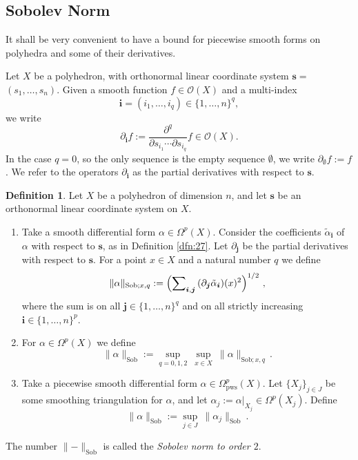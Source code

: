\documentclass[10pt, a4paper]{amsart}
\theoremstyle{definition}
\newtheorem{dfn}[equation]{Definition}
\numberwithin{equation}{section}
\newcommand{\mcal}[1]{\mathcal{#1}}
\newcommand{\mrm}[1]{\mathrm{#1}}
\newcommand{\smfrac}[2]{{\textstyle \frac{#1}{#2}}}
\newcommand{\bsym}[1]{\boldsymbol{#1}}
\newcommand{\bosum}{\sum\nolimits}
\newcommand{\til}[1]{\tilde{#1}}
\newcommand{\norm}[1]{\lVert #1 \rVert}
\newcommand{\lb}{\linebreak}
\begin{document}
\subsection{Sobolev Norm} \label{subsec:sob}
It shall be very convenient to have a bound for piecewise smooth forms
on polyhedra and some of their derivatives. 

Let $X$ be a polyhedron, with orthonormal linear coordinate
system $\bsym{s} =$ \lb  $(s_1, \ldots, s_n)$. Given a smooth function 
$f \in \mcal{O}(X)$ and a multi-index
\[ \bsym{i}  = (i_1, \ldots, i_q) \in \{ 1, \ldots, n \}^q , \]
we write
\[ \partial_{\bsym{i}} f :=
\smfrac{\partial^q}{\partial s_{i_1} \cdots \partial s_{i_q}} f \in  
\mcal{O}(X) . \]
In the case $q = 0$, so the only sequence is the empty sequence 
$\emptyset$, we write
$\partial_{\emptyset} f := f$. 
We refer to the operators $\partial_{\bsym{i}}$ as the partial derivatives
with respect to $\bsym{s}$.

\begin{dfn}
Let $X$ be a polyhedron of dimension $n$, and let $\bsym{s}$ be an
orthonormal linear coordinate system on $X$. 
\begin{enumerate}
\item Take a smooth differential form $\alpha \in \Omega^p(X)$. 
Consider the coefficients $\til{\alpha}_{\bsym{i}}$ of $\alpha$ with
respect to $\bsym{s}$, as in Definition \ref{dfn:27}. 
Let $\partial_{\bsym{j}}$ be the partial derivatives with respect to
$\bsym{s}$. For a point $x \in X$ and a natural number $q$ we define 
\[ \norm{\alpha}_{\mrm{Sob}; x, q} :=
\Bigl( \bosum_{\bsym{i}, \bsym{j}} \, 
(\partial_{\bsym{j}} \til{\alpha}_{\bsym{i}})(x)^2 \Bigr)^{1/2} \ , \]
where the sum is on all 
$\bsym{j} \in \{ 1, \ldots, n \}^q$ and on all strictly increasing 
$\bsym{i} \in \{ 1, \ldots, n \}^p$.

\item For $\alpha \in \Omega^p(X)$ we define 
\[ \norm{\alpha}_{\mrm{Sob}} :=
\sup_{q = 0, 1, 2} \ \sup_{x \in X} \ \norm{\alpha}_{\mrm{Sob}; x, q} \, . \]

\item Take a piecewise smooth differential form
$\alpha \in \Omega^p_{\mrm{pws}}(X)$. 
Let $\{ X_j \}_{j \in J}$ be some smoothing triangulation for $\alpha$,
and let $\alpha_j := \alpha|_{X_j} \in \Omega^p(X_j)$. Define
\[ \norm{\alpha}_{\mrm{Sob}} :=
\sup_{j \in J} \ \norm{ \alpha_j }_{\mrm{Sob}} \ . \]
\end{enumerate}

The number $\norm{-}_{\mrm{Sob}}$ is called the {\em Sobolev norm to order $2$}.
\end{dfn}
\end{document}
